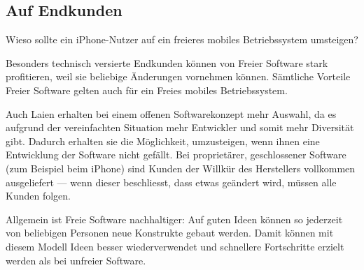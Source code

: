 \subsection{Auf Endkunden}
Wieso sollte ein iPhone-Nutzer auf ein freieres mobiles Betriebssystem umsteigen?

Besonders technisch versierte Endkunden können von Freier Software stark profitieren, weil sie beliebige Änderungen vornehmen können. Sämtliche Vorteile Freier Software gelten auch für ein Freies mobiles Betriebssystem.

Auch Laien erhalten bei einem offenen Softwarekonzept mehr Auswahl, da es aufgrund der vereinfachten Situation mehr Entwickler und somit mehr Diversität gibt. Dadurch erhalten sie die Möglichkeit, umzusteigen, wenn ihnen eine Entwicklung der Software nicht gefällt. Bei proprietärer, geschlossener Software (zum Beispiel beim iPhone) sind Kunden der Willkür des Herstellers vollkommen ausgeliefert --- wenn dieser beschliesst, dass etwas geändert wird, müssen alle Kunden folgen.

Allgemein ist Freie Software nachhaltiger: Auf guten Ideen können so jederzeit von beliebigen Personen neue Konstrukte gebaut werden. Damit können mit diesem Modell Ideen besser wiederverwendet und schnellere Fortschritte erzielt werden als bei unfreier Software.